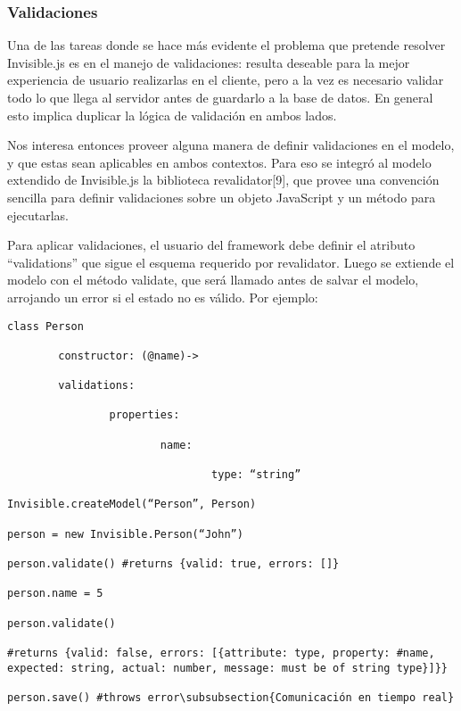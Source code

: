 \documentclass[doc,helv,longtable]{article}
\begin{document}
\subsubsection{Validaciones}


Una de las tareas donde se hace más evidente el problema que pretende resolver Invisible.js es en el manejo de validaciones: resulta deseable para la mejor experiencia de usuario realizarlas en el cliente, pero a la vez es necesario validar todo lo que llega al servidor antes de guardarlo a la base de datos. En general esto implica duplicar la lógica de validación en ambos lados.

Nos interesa entonces proveer alguna manera de definir validaciones en el modelo, y que estas sean aplicables en ambos contextos. Para eso se integró al modelo extendido de Invisible.js la biblioteca revalidator[9], que provee una convención sencilla para definir validaciones sobre un objeto JavaScript y un método para ejecutarlas.

Para aplicar validaciones, el usuario del framework debe definir el atributo “validations” que sigue el esquema requerido por revalidator. Luego se extiende el modelo con el método validate, que será llamado antes de salvar el modelo, arrojando un error si el estado no es válido. Por ejemplo:

\begin{verbatim}
class Person

        constructor: (@name)->

        validations: 

                properties:

                        name:

                                type: “string”

Invisible.createModel(“Person”, Person)

person = new Invisible.Person(“John”)

person.validate() #returns {valid: true, errors: []}

person.name = 5

person.validate() 

#returns {valid: false, errors: [{attribute: type, property: #name, expected: string, actual: number, message: must be of string type}]}}

person.save() #throws error\subsubsection{Comunicación en tiempo real}
\end{verbatim}
\end{document}
